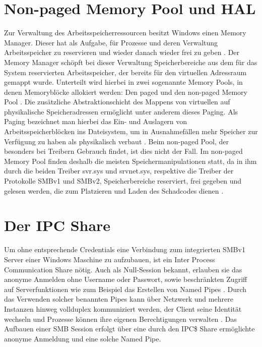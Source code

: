 \documentclass[DIV=12,headings=normal,pdftex,headinclude=false,footinclude=false,final]{scrreprt}
\begin{document}
\section{Non-paged Memory Pool und HAL}\label{sec:mempool}
Zur Verwaltung des Arbeitsspeicherressourcen besitzt Windows einen Memory Manager. Dieser hat als Aufgabe, für Prozesse und deren Verwaltung Arbeitsspeicher zu reservieren und wieder danach wieder frei zu geben \cite{Medium:ExpBible}. Der Memory Manager schöpft bei dieser Verwaltung Speicherbereiche aus dem für das System reservierten Arbeitsspeicher, der bereits für den virtuellen Adressraum gemappt wurde. Unterteilt wird hierbei in zwei sogenannte Memory Pools, in denen Memoryblöcke allokiert werden: Den paged und den non-paged Memory Pool \cite{MS:MemPools}. Die zusätzliche Abstraktionschicht des Mappens von virtuellen auf physikalische Speicheradressen ermöglicht unter anderem dieses Paging. Als Paging bezeichnet man hierbei das Ein- und Auslagern von Arbeitsspeicherblöcken ins Dateisystem, um in Ausnahmefällen mehr Speicher zur Verfügung zu haben als physikalisch verbaut \cite{CompWeek:Paging}. Beim non-paged Pool, der besonders bei Treibern Gebrauch findet, ist dies nicht der Fall. Im non-paged Memory Pool finden deshalb die meisten Speichermanipulationen statt, da in ihm durch die beiden Treiber svr.sys und srvnet.sys, respektive die Treiber der Protokolle SMBv1 und SMBv2, Speicherbereiche reserviert, frei gegeben und gelesen werden, die zum Platzieren und Laden des Schadcodes dienen \cite{SS:EB}.

\section{Der IPC Share}\label{sec:IPC}
Um ohne entsprechende Credentials eine Verbindung zum integrierten SMBv1 Server einer Windows Maschine zu aufzubauen, ist ein Inter Process Communication Share nötig. Auch als Null-Session bekannt, erlauben sie das anonyme Anmelden ohne Username oder Passwort, sowie beschränkten Zugriff auf Serverfunktionen wie zum Beispiel das Erstellen von Named Pipes \cite{MS:IPC}. Durch das Verwenden solcher benannten Pipes kann über Netzwerk und mehrere Instanzen hinweg vollduplex kommuniziert werden, der Client seine Identität wechseln und Prozesse können ihre eigenen Berechtigungen verwalten \cite{MS:NP}. Das Aufbauen einer SMB Session erfolgt über eine durch den IPC\$ Share ermöglichte anonyme Anmeldung und eine solche Named Pipe.
\end{document}
